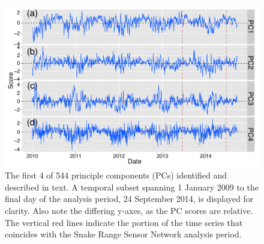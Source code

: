 \documentclass{ametsoc}
\begin{document}
\begin{figure}[ht]

 \centerline{\includegraphics[width=39pc]{figure03_PCs.pdf}}

  \caption{The first 4 of 544 principle components (PCs) identified and described in text.  A temporal subset spanning 1 January 2009 to the final day of the analysis period, 24 September 2014, is displayed for clarity. Also note the differing y-axes, as the PC scores are relative. The vertical red lines indicate the portion of the time series that coincides with the Snake Range Sensor Network analysis period.}\label{fig:3}

\end{figure}
\end{document}
